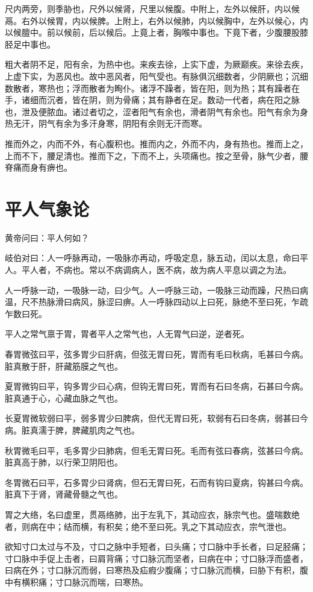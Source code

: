 \documentclass{article}%
\begin{document}
尺内两旁，则季胁也，尺外以候肾，尺里以候腹。中附上，左外以候肝，内以候鬲。右外以候胃，内以候脾。上附上，右外以候肺，内以候胸中，左外以候心，内以候膻中。前以候前，后以候后。上竟上者，胸喉中事也。下竟下者，少腹腰股膝胫足中事也。

粗大者阴不足，阳有余，为热中也。来疾去徐，上实下虚，为厥巅疾。来徐去疾，上虚下实，为恶风也。故中恶风者，阳气受也。有脉俱沉细数者，少阴厥也；沉细数散者，寒热也；浮而散者为眴仆。诸浮不躁者，皆在阳，则为热；其有躁者在手，诸细而沉者，皆在阴，则为骨痛；其有静者在足。数动一代者，病在阳之脉也，泄及便脓血。诸过者切之，涩者阳气有余也，滑者阴气有余也。阳气有余为身热无汗，阴气有余为多汗身寒，阴阳有余则无汗而寒。

推而外之，内而不外，有心腹积也。推而内之，外而不内，身有热也。推而上之，上而不下，腰足清也。推而下之，下而不上，头项痛也。按之至骨，脉气少者，腰脊痛而身有痹也。
\section{平人气象论}
黄帝问曰：平人何如？

岐伯对曰：人一呼脉再动，一吸脉亦再动，呼吸定息，脉五动，闰以太息，命曰平人。平人者，不病也。常以不病调病人，医不病，故为病人平息以调之为法。

人一呼脉一动，一吸脉一动，曰少气。人一呼脉三动，一吸脉三动而躁，尺热曰病温，尺不热脉滑曰病风，脉涩曰痹。人一呼脉四动以上曰死，脉绝不至曰死，乍疏乍数曰死。

平人之常气禀于胃，胃者平人之常气也，人无胃气曰逆，逆者死。

春胃微弦曰平，弦多胃少曰肝病，但弦无胃曰死，胃而有毛曰秋病，毛甚曰今病。脏真散于肝，肝藏筋膜之气也。

夏胃微钩曰平，钩多胃少曰心病，但钩无胃曰死，胃而有石曰冬病，石甚曰今病。脏真通于心，心藏血脉之气也。

长夏胃微软弱曰平，弱多胃少曰脾病，但代无胃曰死，软弱有石曰冬病，弱甚曰今病。脏真濡于脾，脾藏肌肉之气也。

秋胃微毛曰平，毛多胃少曰肺病，但毛无胃曰死。毛而有弦曰春病，弦甚曰今病。脏真高于肺，以行荣卫阴阳也。

冬胃微石曰平，石多胃少曰肾病，但石无胃曰死，石而有钩曰夏病，钩甚曰今病。脏真下于肾，肾藏骨髓之气也。

胃之大络，名曰虚里，贯鬲络肺，出于左乳下，其动应衣，脉宗气也。盛喘数绝者，则病在中；结而横，有积矣；绝不至曰死。乳之下其动应衣，宗气泄也。

欲知寸口太过与不及，寸口之脉中手短者，曰头痛；寸口脉中手长者，曰足胫痛；寸口脉中手促上击者，曰肩背痛；寸口脉沉而坚者，曰病在中；寸口脉浮而盛者，曰病在外；寸口脉沉而弱，曰寒热及疝瘕少腹痛；寸口脉沉而横，曰胁下有积，腹中有横积痛；寸口脉沉而喘，曰寒热。
\end{document}
